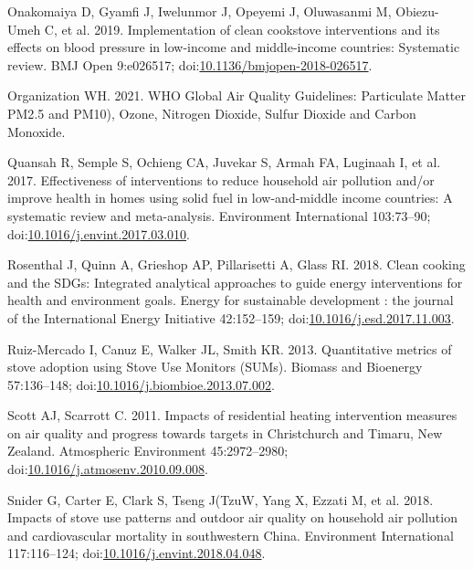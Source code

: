 \documentclass[
  letterpaper,
  DIV=11,
  numbers=noendperiod]{scrartcl}
\newlength{\cslhangindent}
\newlength{\cslentryspacingunit} %
\newenvironment{CSLReferences}[2] %
 {%
  \setlength{\parindent}{0pt}
  \ifodd #1
  \let\oldpar\par
  \def\par{\hangindent=\cslhangindent\oldpar}
  \fi
  \setlength{\parskip}{#2\cslentryspacingunit}
 }%
 {}
\begin{document}
\begin{CSLReferences}{1}{0}
\leavevmode{}%
Onakomaiya D, Gyamfi J, Iwelunmor J, Opeyemi J, Oluwasanmi M,
Obiezu-Umeh C, et al. 2019. Implementation of clean cookstove
interventions and its effects on blood pressure in low-income and
middle-income countries: Systematic review. BMJ Open 9:e026517;
doi:\href{https://doi.org/10.1136/bmjopen-2018-026517}{10.1136/bmjopen-2018-026517}.

\leavevmode{}%
Organization WH. 2021. {WHO Global Air Quality Guidelines}: {Particulate
Matter PM2}.5 and {PM10}), {Ozone}, {Nitrogen Dioxide}, {Sulfur Dioxide}
and {Carbon Monoxide}.

\leavevmode{}%
Quansah R, Semple S, Ochieng CA, Juvekar S, Armah FA, Luginaah I, et al.
2017. Effectiveness of interventions to reduce household air pollution
and/or improve health in homes using solid fuel in low-and-middle income
countries: {A} systematic review and meta-analysis. Environment
International 103:73--90;
doi:\href{https://doi.org/10.1016/j.envint.2017.03.010}{10.1016/j.envint.2017.03.010}.

\leavevmode{}%
Rosenthal J, Quinn A, Grieshop AP, Pillarisetti A, Glass RI. 2018. Clean
cooking and the {SDGs}: {Integrated} analytical approaches to guide
energy interventions for health and environment goals. Energy for
sustainable development : the journal of the International Energy
Initiative 42:152--159;
doi:\href{https://doi.org/10.1016/j.esd.2017.11.003}{10.1016/j.esd.2017.11.003}.

\leavevmode{}%
Ruiz-Mercado I, Canuz E, Walker JL, Smith KR. 2013. Quantitative metrics
of stove adoption using {Stove Use Monitors} ({SUMs}). Biomass and
Bioenergy 57:136--148;
doi:\href{https://doi.org/10.1016/j.biombioe.2013.07.002}{10.1016/j.biombioe.2013.07.002}.

\leavevmode{}%
Scott AJ, Scarrott C. 2011. Impacts of residential heating intervention
measures on air quality and progress towards targets in {Christchurch}
and {Timaru}, {New Zealand}. Atmospheric Environment 45:2972--2980;
doi:\href{https://doi.org/10.1016/j.atmosenv.2010.09.008}{10.1016/j.atmosenv.2010.09.008}.

\leavevmode{}%
Snider G, Carter E, Clark S, Tseng J(TzuW, Yang X, Ezzati M, et al.
2018. Impacts of stove use patterns and outdoor air quality on household
air pollution and cardiovascular mortality in southwestern {China}.
Environment International 117:116--124;
doi:\href{https://doi.org/10.1016/j.envint.2018.04.048}{10.1016/j.envint.2018.04.048}.


\end{CSLReferences}
\end{document}

